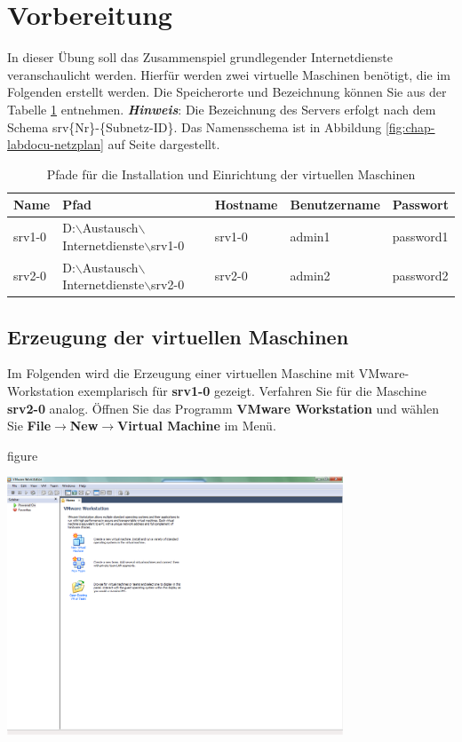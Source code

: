 
\section{Vorbereitung}
In dieser Übung soll das Zusammenspiel grundlegender Internetdienste veranschaulicht werden.
Hierfür werden zwei virtuelle Maschinen benötigt, die im Folgenden erstellt
werden. Die Speicherorte und Bezeichnung können Sie aus der Tabelle
\ref{tab:install-location} entnehmen.
\newline
\newline
\textbf{\textit{Hinweis}}: Die Bezeichnung des Servers erfolgt nach dem
Schema srv\{Nr\}-\{Subnetz-ID\}. Das Namensschema
ist in Abbildung \ref{fig:chap-labdocu-netzplan} auf Seite
\pageref{fig:chap-labdocu-netzplan} dargestellt.

\scriptsize
\begin{table}[!h]
  \centering
	\begin{tabular}{l l l l l}
		\hline
		Name & Pfad & Hostname & Benutzername & Passwort \\
		\hline
		srv1-0 & D:$\backslash$Austausch$\backslash$Internetdienste$\backslash$srv1-0 &
		srv1-0 & admin1 & password1 \\
		srv2-0 & D:$\backslash$Austausch$\backslash$Internetdienste$\backslash$srv2-0 &
		srv2-0 & admin2 & password2 \\
		\hline
	\end{tabular}
	\caption{Pfade für die Installation und Einrichtung der virtuellen Maschinen}
	\label{tab:install-location}
\end{table}
\normalsize 

\subsection{Erzeugung der virtuellen Maschinen}
Im Folgenden wird die Erzeugung einer virtuellen Maschine mit VMware-Workstation
exemplarisch für \textbf{srv1-0} gezeigt. Verfahren Sie für die
Maschine \textbf{srv2-0} analog. Öffnen Sie das Programm  \textbf{VMware
Workstation} und wählen Sie \textbf{File$\rightarrow$New$\rightarrow$Virtual Machine} im Menü.

\begin{nofloat}{figure}
\begin{center}
\includegraphics[width=0.75\textwidth]{screenshots/vm01.png}
\end{center}
\end{nofloat}

